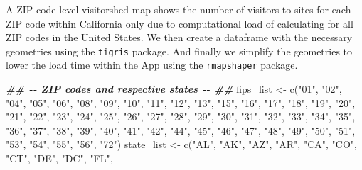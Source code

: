 \documentclass[
  11 pt,
  openany]{book}
\newenvironment{Shaded}{\begin{snugshade}}{\end{snugshade}}
\newcommand{\DocumentationTok}[1]{\textcolor[rgb]{0.56,0.35,0.01}{\textbf{\textit{#1}}}}
\newcommand{\FunctionTok}[1]{\textcolor[rgb]{0.00,0.00,0.00}{#1}}
\newcommand{\NormalTok}[1]{#1}
\newcommand{\OtherTok}[1]{\textcolor[rgb]{0.56,0.35,0.01}{#1}}
\newcommand{\StringTok}[1]{\textcolor[rgb]{0.31,0.60,0.02}{#1}}
\begin{document}
A ZIP-code level visitorshed map shows the number of visitors to sites for each ZIP code within California only due to computational load of calculating for all ZIP codes in the United States. We then create a dataframe with the necessary geometries using the \texttt{tigris} \citep{R-tigris} package. And finally we simplify the geometries to lower the load time within the App using the \texttt{rmapshaper} \citep{R-rmapshaper} package.

\begin{Shaded}
\begin{Highlighting}[]
\DocumentationTok{\#\# {-}{-} ZIP codes and respective states {-}{-} \#\#}
\NormalTok{fips\_list }\OtherTok{\textless{}{-}} 
  \FunctionTok{c}\NormalTok{(}\StringTok{"01"}\NormalTok{, }\StringTok{"02"}\NormalTok{, }\StringTok{"04"}\NormalTok{, }\StringTok{"05"}\NormalTok{, }\StringTok{"06"}\NormalTok{, }\StringTok{"08"}\NormalTok{, }\StringTok{"09"}\NormalTok{, }\StringTok{"10"}\NormalTok{, }\StringTok{"11"}\NormalTok{, }\StringTok{"12"}\NormalTok{, }
    \StringTok{"13"}\NormalTok{, }\StringTok{"15"}\NormalTok{, }\StringTok{"16"}\NormalTok{, }\StringTok{"17"}\NormalTok{, }\StringTok{"18"}\NormalTok{, }\StringTok{"19"}\NormalTok{, }\StringTok{"20"}\NormalTok{, }\StringTok{"21"}\NormalTok{, }\StringTok{"22"}\NormalTok{, }\StringTok{"23"}\NormalTok{, }
    \StringTok{"24"}\NormalTok{, }\StringTok{"25"}\NormalTok{, }\StringTok{"26"}\NormalTok{, }\StringTok{"27"}\NormalTok{, }\StringTok{"28"}\NormalTok{, }\StringTok{"29"}\NormalTok{, }\StringTok{"30"}\NormalTok{, }\StringTok{"31"}\NormalTok{, }\StringTok{"32"}\NormalTok{, }\StringTok{"33"}\NormalTok{, }
    \StringTok{"34"}\NormalTok{, }\StringTok{"35"}\NormalTok{, }\StringTok{"36"}\NormalTok{, }\StringTok{"37"}\NormalTok{, }\StringTok{"38"}\NormalTok{, }\StringTok{"39"}\NormalTok{, }\StringTok{"40"}\NormalTok{, }\StringTok{"41"}\NormalTok{, }\StringTok{"42"}\NormalTok{, }\StringTok{"44"}\NormalTok{, }
    \StringTok{"45"}\NormalTok{, }\StringTok{"46"}\NormalTok{, }\StringTok{"47"}\NormalTok{, }\StringTok{"48"}\NormalTok{, }\StringTok{"49"}\NormalTok{, }\StringTok{"50"}\NormalTok{, }\StringTok{"51"}\NormalTok{, }\StringTok{"53"}\NormalTok{, }\StringTok{"54"}\NormalTok{, }\StringTok{"55"}\NormalTok{, }
    \StringTok{"56"}\NormalTok{, }\StringTok{"72"}\NormalTok{)}
\NormalTok{state\_list }\OtherTok{\textless{}{-}} 
  \FunctionTok{c}\NormalTok{(}\StringTok{"AL"}\NormalTok{, }\StringTok{"AK"}\NormalTok{, }\StringTok{"AZ"}\NormalTok{, }\StringTok{"AR"}\NormalTok{, }\StringTok{"CA"}\NormalTok{, }\StringTok{"CO"}\NormalTok{, }\StringTok{"CT"}\NormalTok{, }\StringTok{"DE"}\NormalTok{, }\StringTok{"DC"}\NormalTok{, }\StringTok{"FL"}\NormalTok{,}

\end{Highlighting}
\end{Shaded}
\end{document}
